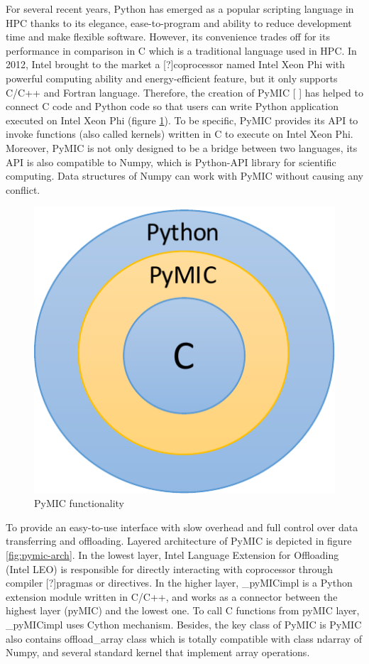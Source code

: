 For several recent years, Python has emerged as a popular scripting language in HPC thanks to its elegance, ease-to-program and ability to reduce development time and make flexible software. However, its convenience trades off for its performance in comparison in C which is a traditional language used in HPC. In 2012, Intel brought to the market a [?]coprocessor named Intel Xeon Phi with powerful computing ability and energy-efficient feature, but it only supports C/C++ and Fortran language. Therefore, the creation of PyMIC [ ] has helped to connect C code and Python code so that users can write Python application executed on Intel Xeon Phi (figure \ref{fig:pymic-feat}). To be specific,  PyMIC provides its API to invoke functions (also called kernels) written in C to execute on Intel Xeon Phi. Moreover, PyMIC is not only designed to be a bridge between two languages, its API is also compatible to Numpy, which is Python-API library for scientific computing. Data structures of Numpy can work with PyMIC without causing any conflict.

\begin{figure}[h]
\centering
\includegraphics[scale=0.5]{img/pymic-feat.pdf}
\caption{PyMIC functionality}
\label{fig:pymic-feat}
\end{figure}

To provide an easy-to-use interface with slow overhead and full control over data transferring and offloading. Layered architecture of PyMIC is depicted in figure \ref{fig:pymic-arch}. In the lowest layer, Intel Language Extension for Offloading (Intel LEO) is responsible for directly interacting with coprocessor through compiler [?]pragmas or directives. In the higher layer, \_pyMICimpl is a Python extension module written in C/C++, and works as a connector between the highest layer (pyMIC) and the lowest one. To call C functions from pyMIC layer, \_pyMICimpl uses Cython mechanism. Besides, the key class of PyMIC is PyMIC also contains offload\_array class which is totally compatible with class ndarray of Numpy, and several standard kernel that implement array operations.		

